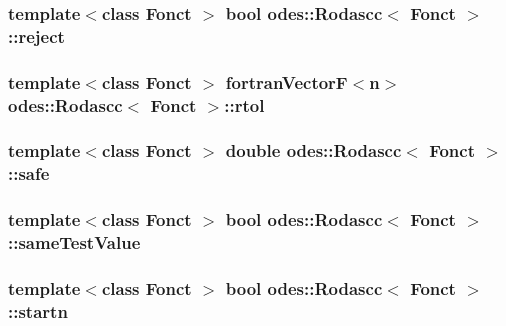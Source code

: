 \hypertarget{classodes_1_1Rodascc_ad411e6b1187bc5e94214cd6c1ed910eb}{
\subsubsection[{reject}]{\setlength{\rightskip}{0pt plus 5cm}template$<$class Fonct $>$ bool {\bf odes\-::\-Rodascc}$<$ Fonct $>$\-::reject\hspace{0.3cm}{\ttfamily [private]}}}\label{classodes_1_1Rodascc_ad411e6b1187bc5e94214cd6c1ed910eb}
\hypertarget{classodes_1_1Rodascc_a4b05acb52219bcbe553c7e3f1a040baf}{
\subsubsection[{rtol}]{\setlength{\rightskip}{0pt plus 5cm}template$<$class Fonct $>$ {\bf fortran\-Vector\-F}$<${\bf n}$>$ {\bf odes\-::\-Rodascc}$<$ Fonct $>$\-::rtol\hspace{0.3cm}{\ttfamily [private]}}}\label{classodes_1_1Rodascc_a4b05acb52219bcbe553c7e3f1a040baf}
\hypertarget{classodes_1_1Rodascc_adfa0782a940d5c22eb43c026f2cdf1a0}{
\subsubsection[{safe}]{\setlength{\rightskip}{0pt plus 5cm}template$<$class Fonct $>$ double {\bf odes\-::\-Rodascc}$<$ Fonct $>$\-::safe\hspace{0.3cm}{\ttfamily [private]}}}\label{classodes_1_1Rodascc_adfa0782a940d5c22eb43c026f2cdf1a0}
\hypertarget{classodes_1_1Rodascc_ad97944f0345c84949353db3c1789cd80}{
\subsubsection[{same\-Test\-Value}]{\setlength{\rightskip}{0pt plus 5cm}template$<$class Fonct $>$ bool {\bf odes\-::\-Rodascc}$<$ Fonct $>$\-::same\-Test\-Value\hspace{0.3cm}{\ttfamily [private]}}}\label{classodes_1_1Rodascc_ad97944f0345c84949353db3c1789cd80}
\hypertarget{classodes_1_1Rodascc_a8565bca186861dec6077cc7f2d05584a}{
\subsubsection[{startn}]{\setlength{\rightskip}{0pt plus 5cm}template$<$class Fonct $>$ bool {\bf odes\-::\-Rodascc}$<$ Fonct $>$\-::startn\hspace{0.3cm}{\ttfamily [private]}}}\label{classodes_1_1Rodascc_a8565bca186861dec6077cc7f2d05584a}
